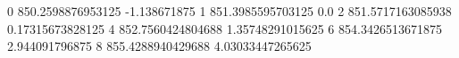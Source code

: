 0 850.2598876953125 -1.138671875
1 851.3985595703125 0.0
2 851.5717163085938 0.17315673828125
4 852.7560424804688 1.35748291015625
6 854.3426513671875 2.944091796875
8 855.4288940429688 4.03033447265625
